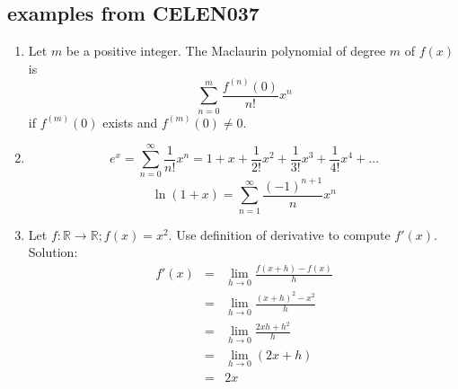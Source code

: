 \documentclass{article}
\begin{document}
\subsection{examples from CELEN037}
\begin{enumerate}

	
	\item 
	Let $m$ be a positive integer. The Maclaurin polynomial of degree $m$ of $f(x)$ is
	\[
	\sum_{n=0}^{m}\frac{f^{(n)}(0)}{n!}x^n
	\]
	if $f^{(m)}(0)$ exists and $f^{(m)}(0)\ne 0$.
	
	\item 
	\begin{equation}
		e^x = \sum_{n=0}^{\infty} \frac{1}{n!}x^n = 1+x+\frac{1}{2!}x^2 +\frac{1}{3!}x^3+ \frac{1}{4!}x^4   + \ldots
	\end{equation}
	\begin{equation}
		\ln(1+x)=\sum_{n=1}^{\infty}\frac{(-1)^{n+1}}{n}x^n
	\end{equation}
	
	
	
	\item 
	Let $f: \mathbb{R}\to \mathbb{R}; f(x)=x^2$. Use definition of derivative to compute $f'(x)$.\\

	Solution:
	\begin{eqnarray*}
		f'(x) &=& \lim_{h\to 0}\frac{f(x+h)-f(x)}{h}\\
		&=& \lim_{h\to 0}\frac{(x+h)^2-x^2}{h}\\
		&=& \lim_{h\to 0}\frac{2xh+h^2}{h}\\
		&=& \lim_{h\to 0}(2x+h)\\
		&=& 2x
	\end{eqnarray*}	
	
\end{enumerate}
\end{document}
